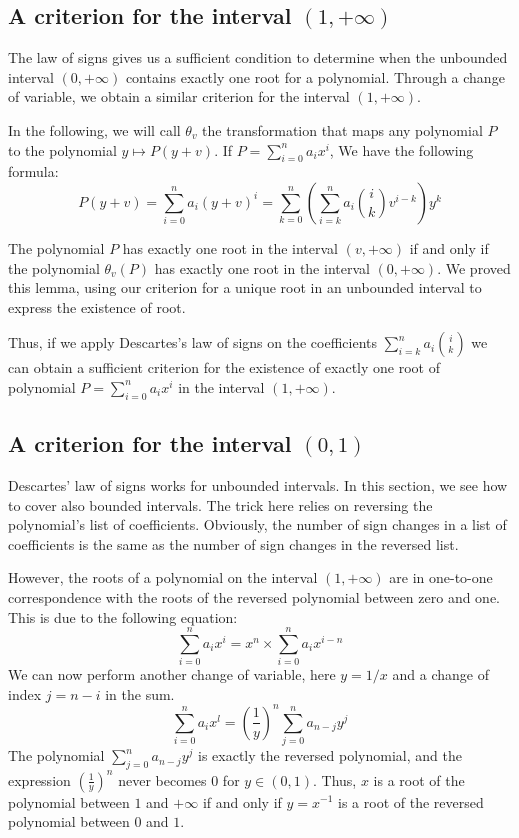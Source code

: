 \documentclass{mscs}
\begin{document}
\subsection{A criterion for the interval \((1,+\infty)\)}
The law of signs gives us a sufficient condition to determine when the
unbounded interval \((0,+\infty)\) contains exactly one root for a
polynomial. Through a change of variable, we obtain a similar
criterion for the interval \((1, +\infty)\).

In the following, we will call \(\theta_v\) the transformation that
maps any polynomial \(P\) to the polynomial \(y \mapsto P(y+v)\).  If
\(P=\sum_{i=0}^n a_i x^i\), We have the following formula:
\[P(y+v)= \sum_{i=0}^{n} a_i (y+v)^i = \sum_{k=0}^{n}
(\sum_{i=k}^{n}a_i\binom{i}{k}v^{i-k}) y^k\]

The polynomial \(P\) has exactly one root in the interval \((v,+\infty)\)
if  and only if
the polynomial \(\theta_v(P)\) has exactly one root in the interval
\((0,+\infty)\).  %
We proved this lemma, using our criterion for a unique root
in an unbounded interval to express the existence of root.

Thus, if we apply Descartes's law of signs on the coefficients
\(\sum_{i=k}^{n}a_i\binom{i}{k}\)
 we
can obtain a sufficient criterion for the existence of exactly one
root of polynomial \(P=\sum_{i=0}^{n}a_ix^i\) in the interval
\((1,+\infty)\).
\subsection{A criterion for the interval \((0,1)\)}
Descartes' law of signs works for unbounded intervals.  In this
section, we see how to cover also bounded intervals. The trick here relies
on reversing the polynomial's list of coefficients.  Obviously, the
number of sign changes in a list of coefficients is the same as the
number of sign changes in the reversed list.

However, the roots of a polynomial on the interval \((1,+\infty)\)
are in one-to-one correspondence with the roots of the
reversed polynomial between zero and one. This is due to the following
equation:
\[\sum_{i=0}^{n}a_i x^i = x^n\times\sum_{i=0}^{n}a_i x^{i-n}\]
We can now perform another change of variable, here \(y=1/x\) and a
change of index \(j=n-i\) in the sum.
\[\sum_{i=0}^{n}a_i x^l = (\frac{1}{y})^n \sum_{j=0}^{n}a_{n-j} y^j\]
The polynomial \(\sum_{j=0}^{n} a_{n-j}y^j\) is exactly the reversed
polynomial, and the expression \((\frac{1}{y})^n\) never becomes 0 for
\(y\in (0,1)\).  Thus, \(x\) is a root of the polynomial between \(1\)
and \(+\infty\) if and only if \(y=x^{-1}\) is a root of the reversed
polynomial between \(0\) and \(1\).
\end{document}
